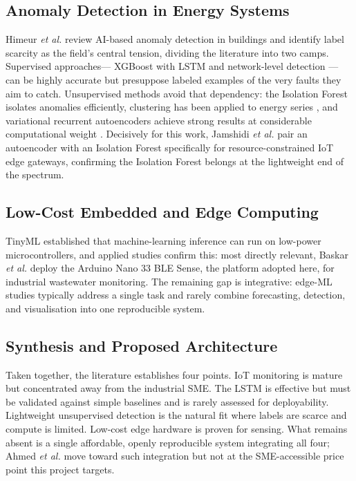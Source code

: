 \documentclass[conference]{IEEEtran}
\begin{document}
\subsection{Anomaly Detection in Energy Systems}
Himeur \textit{et al.} \cite{himeur2021artificial} review AI-based anomaly
detection in buildings and identify label scarcity as the field's central
tension, dividing the literature into two camps. Supervised approaches---
XGBoost with LSTM \cite{chen2024effective} and network-level detection \cite{sahu2020machine}---
can be highly accurate but presuppose labeled examples of the very faults they
aim to catch. Unsupervised methods avoid that dependency: the Isolation Forest
\cite{liu2008isolation} isolates anomalies efficiently, clustering has been
applied to energy series \cite{jesmeen2021unsupervised}, and variational
recurrent autoencoders achieve strong results at considerable computational
weight \cite{pereira2018unsupervised}. Decisively for this work, Jamshidi
\textit{et al.} \cite{jamshidi2025lightweight} pair an autoencoder with an
Isolation Forest specifically for resource-constrained IoT edge gateways,
confirming the Isolation Forest belongs at the lightweight end of the spectrum.
 
\subsection{Low-Cost Embedded and Edge Computing}
TinyML \cite{warden2019tinyml} established that machine-learning inference can
run on low-power microcontrollers, and applied studies confirm this:
most directly relevant, Baskar \textit{et al.} \cite{baskar2024edge} deploy the Arduino Nano 33 BLE Sense, the platform
adopted here, for industrial wastewater monitoring. The remaining gap is
integrative: edge-ML studies typically address a single task and rarely combine
forecasting, detection, and visualisation into one reproducible system.
 
\subsection{Synthesis and Proposed Architecture}
Taken together, the literature establishes four points. IoT monitoring is
mature but concentrated away from the industrial SME. The LSTM is effective but
must be validated against simple baselines and is rarely assessed for
deployability. Lightweight unsupervised detection is the natural fit where
labels are scarce and compute is limited. Low-cost edge hardware is proven for
sensing. What remains absent is a single affordable, openly reproducible system
integrating all four; Ahmed \textit{et al.} \cite{ahmed2020machine} move toward
such integration but not at the SME-accessible price point this project
targets.
 
\end{document}
